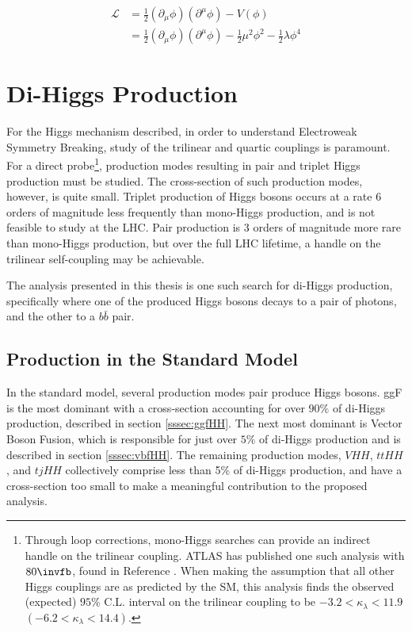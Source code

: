 \begin{equation} \label{higgs-lagrangian}
    \begin{aligned}
        \mathcal{L} &= \frac{1}{2}(\partial_{\mu}\phi)(\partial^{\mu}\phi) - V(\phi)\\
        &= \frac{1}{2}(\partial_{\mu}\phi)(\partial^{\mu}\phi) - \frac{1}{2}\mu^2\phi^2 - \frac{1}{2}\lambda\phi^4
    \end{aligned}
\end{equation}



\section{Di-Higgs Production}

For the Higgs mechanism described, in order to understand Electroweak Symmetry Breaking, study of the trilinear and quartic couplings is paramount. For a direct probe\footnote{Through loop corrections, mono-Higgs searches can provide an indirect handle on the trilinear coupling. ATLAS has published one such analysis with $\unit{80}{\invfb}$, found in Reference \cite{monohiggs-selfcoupling}. When making the assumption that all other Higgs couplings are as predicted by the \gls{SM}, this analysis finds the observed (expected) $95\%$ C.L. interval on the trilinear coupling to be $-3.2 < \kappa_\lambda <11.9$   $(-6.2 < \kappa_\lambda <14.4)$. }, production modes resulting in pair and triplet Higgs production must be studied. The cross-section of such production modes, however, is quite small. Triplet production of Higgs bosons occurs at a rate 6 orders of magnitude less frequently than mono-Higgs production, and is not feasible to study at the \gls{LHC}. Pair production is 3 orders of magnitude more rare than mono-Higgs production, but over the full \gls{LHC} lifetime, a handle on the trilinear self-coupling may be achievable.

The analysis presented in this thesis is one such search for di-Higgs production, specifically where one of the produced Higgs bosons decays to a pair of photons, and the other to a $b\bar{b}$ pair.

\subsection{Production in the Standard Model}
In the standard model, several production modes pair produce Higgs bosons. \gls{ggF} is the most dominant with a cross-section accounting for over $90\%$ of di-Higgs production, described in section \ref{sssec:ggfHH}. The next most dominant is Vector Boson Fusion, which is responsible for just over $5\%$ of di-Higgs production and is described in section \ref{sssec:vbfHH}. The remaining production modes, $VHH$, $ttHH$, and $tjHH$ collectively comprise less than 5\% of di-Higgs production, and have a cross-section too small to make a meaningful contribution to the proposed analysis.

